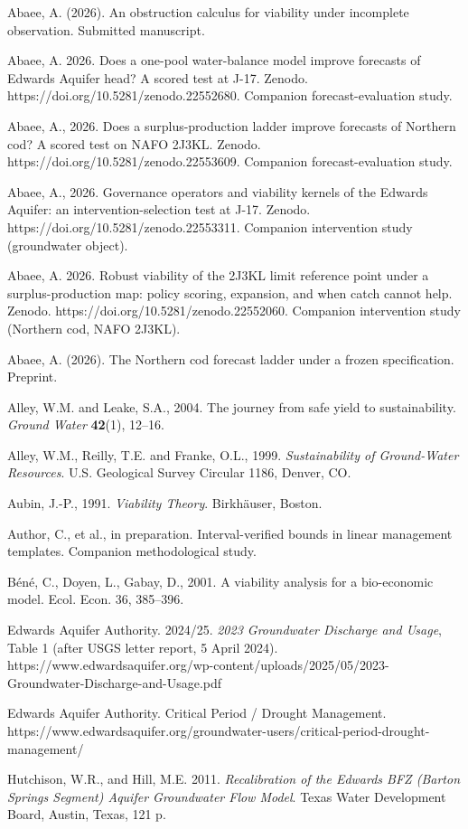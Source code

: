 Abaee, A. (2026). An obstruction calculus for viability under
incomplete observation. Submitted manuscript.

Abaee, A. 2026. Does a one-pool water-balance model improve forecasts of
Edwards Aquifer head? A scored test at J-17. Zenodo.
https://doi.org/10.5281/zenodo.22552680. Companion forecast-evaluation
study.

Abaee, A., 2026. Does a surplus-production ladder improve forecasts of
Northern cod? A scored test on NAFO 2J3KL. Zenodo.
https://doi.org/10.5281/zenodo.22553609. Companion forecast-evaluation
study.

Abaee, A., 2026. Governance operators and viability kernels of the
Edwards Aquifer: an intervention-selection test at J-17. Zenodo.
https://doi.org/10.5281/zenodo.22553311. Companion intervention study
(groundwater object).

Abaee, A. 2026. Robust viability of the 2J3KL limit reference point
under a surplus-production map: policy scoring, expansion, and when
catch cannot help. Zenodo. https://doi.org/10.5281/zenodo.22552060.
Companion intervention study (Northern cod, NAFO 2J3KL).

Abaee, A. (2026). The Northern cod forecast ladder under a frozen
specification. Preprint.

Alley, W.M. and Leake, S.A., 2004. The journey from safe yield to sustainability.
\emph{Ground Water} \textbf{42}(1), 12--16.

Alley, W.M., Reilly, T.E. and Franke, O.L., 1999. \emph{Sustainability of Ground-Water
Resources}. U.S. Geological Survey Circular 1186, Denver, CO.

Aubin, J.-P., 1991. \emph{Viability Theory}. Birkh\"auser, Boston.


Author, C., et al., in preparation. Interval-verified bounds in linear
management templates. Companion methodological study.

B\'en\'e, C., Doyen, L., Gabay, D., 2001. A viability analysis for a
bio-economic model. Ecol. Econ. 36, 385--396.

Edwards Aquifer Authority. 2024/25. \emph{2023 Groundwater Discharge and
Usage}, Table 1 (after USGS letter report, 5 April 2024).
https://www.edwardsaquifer.org/wp-content/uploads/2025/05/2023-Groundwater-Discharge-and-Usage.pdf

Edwards Aquifer Authority. Critical Period / Drought Management.
https://www.edwardsaquifer.org/groundwater-users/critical-period-drought-management/

Hutchison, W.R., and Hill, M.E. 2011. \emph{Recalibration of the Edwards
BFZ (Barton Springs Segment) Aquifer Groundwater Flow Model}. Texas
Water Development Board, Austin, Texas, 121 p.

